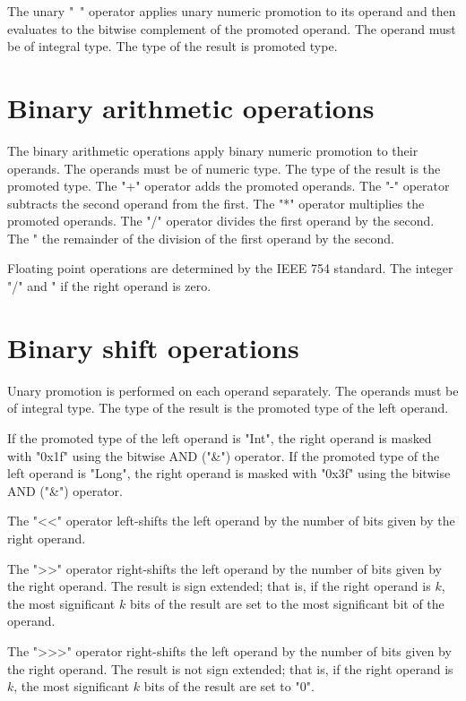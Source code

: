  The unary \xcd"~" operator
applies unary numeric promotion to its operand
and then
 evaluates to the bitwise complement of
 the promoted operand.
  The operand must be of integral type.
The type of the result is promoted type.

\section{Binary arithmetic operations} 

The binary arithmetic operations apply binary numeric promotion
to their operands. The operands must be of numeric type.
The type of the result is the promoted type.
The
\xcd"+" operator adds the promoted operands. The \xcd"-" operator
subtracts the second operand from the first. The \xcd"*" operator
multiplies the  promoted  operands. The \xcd"/" operator
divides the
first  operand  by the second.
The \xcd"%
the remainder of the division of the first operand by the
second.

Floating point operations are determined by the IEEE 754
standard. 
The integer \xcd"/" and \xcd"%
if the right operand is zero.

\section{Binary shift operations}

Unary promotion is performed on each operand separately. 
The operands must be of integral type.
The type of the result is the promoted type of the left operand.

If the promoted type of the left operand is \xcd"Int",
the right operand is masked with \xcd"0x1f" using the bitwise
AND (\xcd"&") operator.
If the promoted type of the left operand is \xcd"Long",
the right operand is masked with \xcd"0x3f" using the bitwise
AND (\xcd"&") operator.

The \xcd"<<" operator left-shifts the left operand by the number of
bits given by the right operand.

The \xcd">>" operator right-shifts the left operand by the number of
bits given by the right operand.  The result is sign extended;
that is, if the right operand is $k$,
the most significant $k$ bits of the result are set to the most
significant bit of the operand.

The \xcd">>>" operator right-shifts the left operand by the number of
bits given by the right operand.  The result is not sign extended;
that is, if the right operand is $k$,
the most significant $k$ bits of the result are set to \xcd"0".

